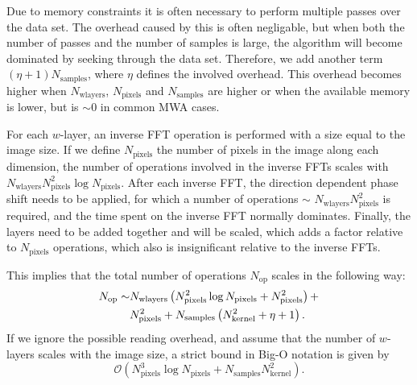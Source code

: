 \documentclass[useAMS,usenatbib]{mn2e}
\begin{document}
Due to memory constraints it is often necessary to perform multiple passes over the data set. The overhead caused by this is often negligable, but when both the number of passes and the number of samples is large, the algorithm will become dominated by seeking through the data set. Therefore, we add another term $(\eta+1) N_\textrm{samples}$, where $\eta$ defines the involved overhead. This overhead becomes higher when $N_\textrm{wlayers}$, $N_\textrm{pixels}$ and $N_\textrm{samples}$ are higher or when the available memory is lower, but is $\sim 0$ in common MWA cases.

For each $w$-layer, an inverse FFT operation is performed with a size equal to the image size. If we define $N_\textrm{pixels}$ the number of pixels in the image along each dimension, the number of operations involved in the inverse FFTs scales with $N_\textrm{wlayers} N^2_\textrm{pixels} \log N_\textrm{pixels}$. After each inverse FFT, the direction dependent phase shift needs to be applied, for which a number of operations $\sim$ $N_\textrm{wlayers} N^2_\textrm{pixels}$ is required, and the time spent on the inverse FFT normally dominates. Finally, the layers need to be added together and will be scaled, which adds a factor relative to $N_\textrm{pixels}$ operations, which also is insignificant relative to the inverse FFTs.

This implies that the total number of operations $N_\textrm{op}$ scales in the following way:
\begin{align} \notag
 N_\textrm{op} \sim & N_\textrm{wlayers} \left( N^2_\textrm{pixels} \log N_\textrm{pixels} + N^2_\textrm{pixels} \right) + \\
 & N^2_\textrm{pixels} + N_\textrm{samples} \left( N^2_\textrm{kernel} + {\eta} + 1 \right).
\end{align}
If we ignore the possible reading overhead, and assume that the number of $w$-layers scales with the image size, a strict bound in Big-O notation is given by
\begin{equation}
\mathcal{O}\left(N^3_\textrm{pixels} \log N_\textrm{pixels} + N_\textrm{samples} N^2_\textrm{kernel}\right).
\end{equation}
\end{document}
